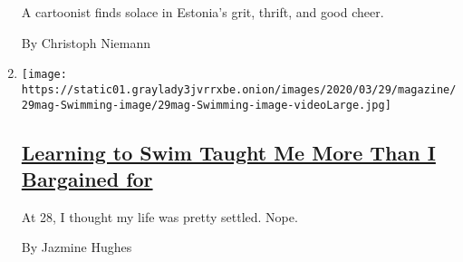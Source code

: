 \begin{enumerate}
  A cartoonist finds solace in Estonia's grit, thrift, and good cheer.

  By Christoph Niemann
\item
  \texttt{[image: https://static01.graylady3jvrrxbe.onion/images/2020/03/29/magazine/29mag-Swimming-image/29mag-Swimming-image-videoLarge.jpg]}

  \hypertarget{learning-to-swim-taught-me-more-than-i-bargained-for}{%
  \subsection{\texorpdfstring{\href{/interactive/2020/03/24/magazine/learning-to-swim.html}{Learning
  to Swim Taught Me More Than I Bargained
  for}}{Learning to Swim Taught Me More Than I Bargained for}}\label{learning-to-swim-taught-me-more-than-i-bargained-for}}

  At 28, I thought my life was pretty settled. Nope.

  By Jazmine Hughes
\end{enumerate}

